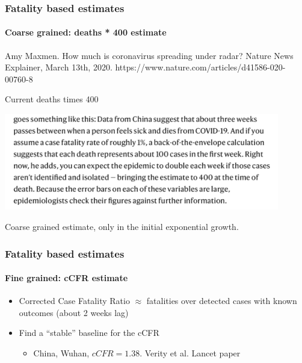 \documentclass{beamer}
\begin{document}
\begin{frame}
  \frametitle{Fatality based estimates}
  \framesubtitle{Coarse grained: deaths * 400 estimate}
  Amy Maxmen. How much is coronavirus spreading under radar? 
  Nature News Explainer, March 13th, 2020. https://www.nature.com/articles/d41586-020-00760-8

  \begin{block}{Current deaths times 400}
  \begin{center}
  \includegraphics[width=0.9\textwidth]{Amy.png}
  \end{center}
  \end{block}
  Coarse grained estimate, only in the initial exponential growth. 
\end{frame}

\begin{frame}
  \frametitle{Fatality based estimates}
  \framesubtitle{Fine grained: cCFR estimate}
  \begin{itemize}
    \item Corrected Case Fatality Ratio $\approx$ fatalities over detected cases with known outcomes (about 2 weeks lag)
    \item Find a ``stable'' baseline for the cCFR 
      \begin{itemize}
        \item China, Wuhan, $cCFR=1.38$.  Verity et al. Lancet paper
      \end{itemize}
  \end{itemize}
\end{frame}
\end{document}

